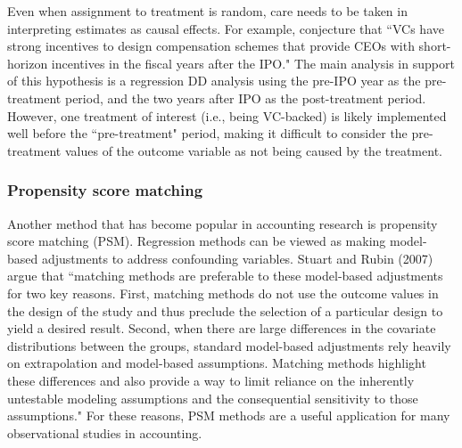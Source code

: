 \documentclass[11pt,reqno,titlepage]{amsart}
\begin{document}
\begin{doublespace}
Even when assignment to treatment is random, care needs to be taken in interpreting estimates as causal effects.
For example, \citet[p.\,1305]{Cadman:2014cr} conjecture that ``VCs have strong incentives to design compensation schemes that provide CEOs with short-horizon incentives in the fiscal years after the IPO." 
The main analysis in support of this hypothesis is a regression DD analysis \citep[pp.\,233--241]{Angrist:2008vk} using the pre-IPO year as the pre-treatment period, and the two years after IPO as the post-treatment period. 
However, one treatment of interest (i.e., being VC-backed) is likely implemented well before the ``pre-treatment" period, making it difficult to consider the pre-treatment values of the outcome variable as not being caused by the treatment.
%
\subsubsection{Propensity score matching}
Another method that has become popular in accounting research is propensity score matching (PSM).
Regression methods can be viewed as making model-based adjustments to address confounding variables.  
Stuart and Rubin (2007) argue that ``matching methods are preferable to these model-based adjustments for two key reasons. 
First, matching methods do not use the outcome values in the design of the study and thus preclude the selection of a particular design to yield a desired result.
Second, when there are large differences in the covariate distributions between the groups, standard model-based adjustments rely heavily on extrapolation and model-based assumptions.
Matching methods highlight these differences and also provide a way to limit reliance on the inherently untestable modeling assumptions and the consequential sensitivity to those assumptions."  For these reasons, PSM methods are a useful application for many observational studies in accounting.


\end{doublespace}
\end{document}
